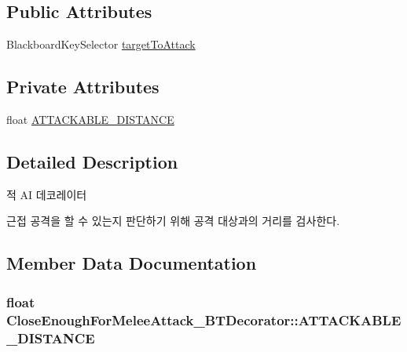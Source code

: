 \subsection*{Public Attributes}
\begin{DoxyCompactItemize}
\item 
Blackboard\+Key\+Selector \hyperlink{class_close_enough_for_melee_attack___b_t_decorator_a282f26ed267baec9c049ccebc61f767e}{target\+To\+Attack}
\end{DoxyCompactItemize}
\subsection*{Private Attributes}
\begin{DoxyCompactItemize}
\item 
float \hyperlink{class_close_enough_for_melee_attack___b_t_decorator_ad97a0c9cac18c905a4ae4cfe59c07815}{A\+T\+T\+A\+C\+K\+A\+B\+L\+E\+\_\+\+D\+I\+S\+T\+A\+N\+CE}
\end{DoxyCompactItemize}


\subsection{Detailed Description}
적 AI 데코레이터 

근접 공격을 할 수 있는지 판단하기 위해 공격 대상과의 거리를 검사한다. 

\subsection{Member Data Documentation}
\subsubsection[{\texorpdfstring{A\+T\+T\+A\+C\+K\+A\+B\+L\+E\+\_\+\+D\+I\+S\+T\+A\+N\+CE}{ATTACKABLE_DISTANCE}}]{\setlength{\rightskip}{0pt plus 5cm}float Close\+Enough\+For\+Melee\+Attack\+\_\+\+B\+T\+Decorator\+::\+A\+T\+T\+A\+C\+K\+A\+B\+L\+E\+\_\+\+D\+I\+S\+T\+A\+N\+CE\hspace{0.3cm}{\ttfamily [private]}}\hypertarget{class_close_enough_for_melee_attack___b_t_decorator_ad97a0c9cac18c905a4ae4cfe59c07815}{}\label{class_close_enough_for_melee_attack___b_t_decorator_ad97a0c9cac18c905a4ae4cfe59c07815}
